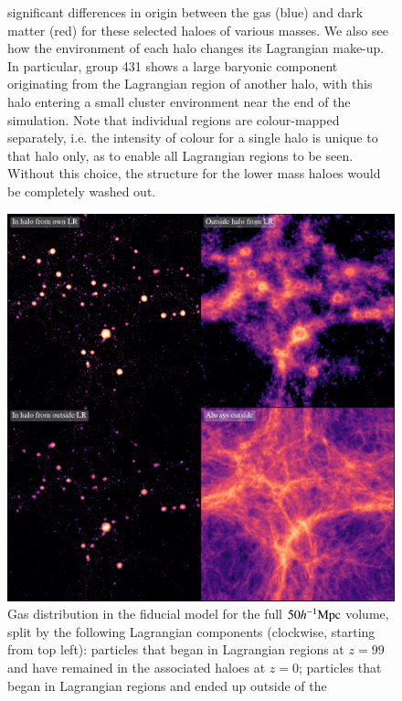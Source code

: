 \begin{figure}
{ significant differences in origin between the gas (blue) and dark matter
 (red) for these selected haloes of various masses. We also see how the
 environment of each halo changes its Lagrangian make-up. In particular,
 group 431 shows a large baryonic component originating from the Lagrangian
 region of another halo, with this halo entering a small cluster environment
 near the end of the simulation. Note that individual regions are
 colour-mapped separately, i.e. the intensity of colour for a single halo is
 unique to that halo only, as to enable all Lagrangian regions to be seen.
 Without this choice, the structure for the lower mass haloes would be
 completely washed out.}
	\vspace{1cm}
	\label{fig:bigtransferpic}
\end{figure}


\begin{figure}
    \centering
    \vspace{1cm}
    \includegraphics{figures/s50j7kAHF/four_images_magma_AHF.pdf}
    \caption{Gas distribution in the fiducial \simba{} model for the full
    $50h^{-1}{\rm Mpc}{}$ volume, split by the following Lagrangian components
    (clockwise, starting from top left): particles that began in Lagrangian
    regions at $z=99$ and have remained in the associated haloes at $z=0$;
    particles that began in Lagrangian regions and ended up outside of the
}
\end{figure}
